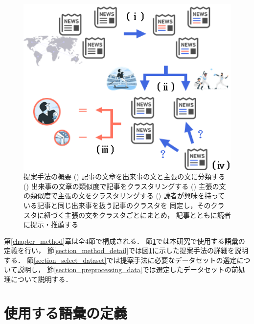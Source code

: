 \documentclass[12pt,a4j]{jreport}
\begin{document}
\begin{figure}[H]
	\centering
	\includegraphics[keepaspectratio, width=120mm]{img/method_abstract.png}
	\caption{
    提案手法の概要
    \newline
    \qquad\quad()
    記事の文章を出来事の文と主張の文に分類する
    \newline
    \qquad\quad()
    出来事の文章の類似度で記事をクラスタリングする
    \newline
    \qquad\quad()
    主張の文の類似度で主張の文をクラスタリングする
    \newline
    \qquad\quad()
    読者が興味を持っている記事と同じ出来事を扱う記事のクラスタを
    \newline
    \qquad\qquad\quad
    同定し，そのクラスタに紐づく主張の文をクラスタごとにまとめ，
    \newline
    \qquad\qquad\quad
    記事とともに読者に提示・推薦する
  }
	\label{fig_method_abstract}
\end{figure}

第\ref{chapter_method}章は全4節で構成される．
節\ref{section_term_definition}では本研究で使用する語彙の定義を行い，
節\ref{section_method_detail}では図\ref{fig_method_abstract}に示した提案手法の詳細を説明する．
節\ref{section_select_dataset}では提案手法に必要なデータセットの選定について説明し，
節\ref{section_preprocessing_data}では選定したデータセットの前処理について説明する．

\section{使用する語彙の定義}
\label{section_term_definition}
\end{document}
